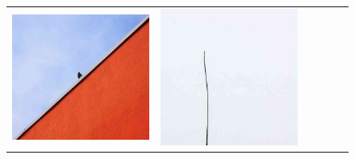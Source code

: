 \begin{figure}
\begin{tabular}{m{.01\linewidth} m{.16\linewidth} m{.16\linewidth} m{.16\linewidth} m{.16\linewidth} m{.16\linewidth}}
    \includegraphics[width=\linewidth]{../style/figures/flickr_on_flickr/pred_style_Minimal/1.jpg} &
    \includegraphics[width=\linewidth]{../style/figures/flickr_on_flickr/pred_style_Minimal/2.jpg} &

\end{tabular}
\end{figure}
